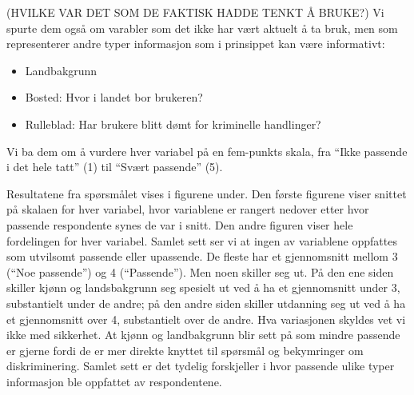 \documentclass[
]{book}
\begin{document}
(HVILKE VAR DET SOM DE FAKTISK HADDE TENKT Å BRUKE?)
Vi spurte dem også om varabler som det ikke har vært aktuelt å ta bruk, men som representerer andre typer informasjon som i prinsippet kan være informativt:

\begin{itemize}
\item
  Landbakgrunn
\item
  Bosted: Hvor i landet bor brukeren?
\item
  Rulleblad: Har brukere blitt dømt for kriminelle handlinger?
\end{itemize}

Vi ba dem om å vurdere hver variabel på en fem-punkts skala, fra ``Ikke passende i det hele tatt'' (1) til ``Svært passende'' (5).

Resultatene fra spørsmålet vises i figurene under.
Den første figurene viser snittet på skalaen for hver variabel, hvor variablene er rangert nedover etter hvor passende respondente synes de var i snitt. Den andre figuren viser hele fordelingen for hver variabel. Samlet sett ser vi at ingen av variablene oppfattes som utvilsomt passende eller upassende. De fleste har et gjennomsnitt mellom 3 (``Noe passende'') og 4 (``Passende''). Men noen skiller seg ut. På den ene siden skiller kjønn og landsbakgrunn seg spesielt ut ved å ha et gjennomsnitt under 3, substantielt under de andre; på den andre siden skiller utdanning seg ut ved å ha et gjennomsnitt over 4, substantielt over de andre. Hva variasjonen skyldes vet vi ikke med sikkerhet. At kjønn og landbakgrunn blir sett på som mindre passende er gjerne fordi de er mer direkte knyttet til spørsmål og bekymringer om diskriminering. Samlet sett er det tydelig forskjeller i hvor passende ulike typer informasjon ble oppfattet av respondentene.
\end{document}
